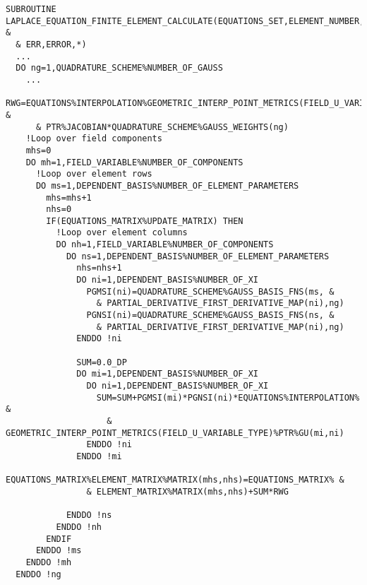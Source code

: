 {\footnotesize
\begin{lstlisting}
SUBROUTINE LAPLACE_EQUATION_FINITE_ELEMENT_CALCULATE(EQUATIONS_SET,ELEMENT_NUMBER, &
  & ERR,ERROR,*)
  ...
  DO ng=1,QUADRATURE_SCHEME%NUMBER_OF_GAUSS
    ...
    RWG=EQUATIONS%INTERPOLATION%GEOMETRIC_INTERP_POINT_METRICS(FIELD_U_VARIABLE_TYPE)% &
      & PTR%JACOBIAN*QUADRATURE_SCHEME%GAUSS_WEIGHTS(ng)
    !Loop over field components
    mhs=0          
    DO mh=1,FIELD_VARIABLE%NUMBER_OF_COMPONENTS
      !Loop over element rows
      DO ms=1,DEPENDENT_BASIS%NUMBER_OF_ELEMENT_PARAMETERS
        mhs=mhs+1
        nhs=0
        IF(EQUATIONS_MATRIX%UPDATE_MATRIX) THEN
          !Loop over element columns
          DO nh=1,FIELD_VARIABLE%NUMBER_OF_COMPONENTS
            DO ns=1,DEPENDENT_BASIS%NUMBER_OF_ELEMENT_PARAMETERS
              nhs=nhs+1
              DO ni=1,DEPENDENT_BASIS%NUMBER_OF_XI
                PGMSI(ni)=QUADRATURE_SCHEME%GAUSS_BASIS_FNS(ms, &
                  & PARTIAL_DERIVATIVE_FIRST_DERIVATIVE_MAP(ni),ng)
                PGNSI(ni)=QUADRATURE_SCHEME%GAUSS_BASIS_FNS(ns, &
                  & PARTIAL_DERIVATIVE_FIRST_DERIVATIVE_MAP(ni),ng)
              ENDDO !ni

              SUM=0.0_DP
              DO mi=1,DEPENDENT_BASIS%NUMBER_OF_XI
                DO ni=1,DEPENDENT_BASIS%NUMBER_OF_XI
                  SUM=SUM+PGMSI(mi)*PGNSI(ni)*EQUATIONS%INTERPOLATION% &
                    & GEOMETRIC_INTERP_POINT_METRICS(FIELD_U_VARIABLE_TYPE)%PTR%GU(mi,ni)
                ENDDO !ni
              ENDDO !mi
              EQUATIONS_MATRIX%ELEMENT_MATRIX%MATRIX(mhs,nhs)=EQUATIONS_MATRIX% &
                & ELEMENT_MATRIX%MATRIX(mhs,nhs)+SUM*RWG

            ENDDO !ns
          ENDDO !nh
        ENDIF
      ENDDO !ms
    ENDDO !mh
  ENDDO !ng
\end{lstlisting}
}
